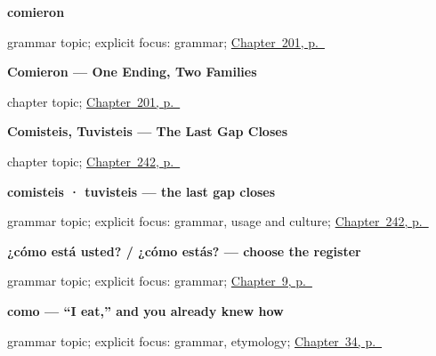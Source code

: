 \noindent\begin{minipage}[t]{\linewidth}
\raggedright
\textbf{comieron}\par
\footnotesize grammar topic; explicit focus: grammar; \hyperref[ch:comieron]{Chapter~201, p.~\pageref*{ch:comieron}}
\end{minipage}\par\smallskip

\noindent\begin{minipage}[t]{\linewidth}
\raggedright
\textbf{Comieron --- One Ending, Two Families}\par
\footnotesize chapter topic; \hyperref[ch:comieron]{Chapter~201, p.~\pageref*{ch:comieron}}
\end{minipage}\par\smallskip

\noindent\begin{minipage}[t]{\linewidth}
\raggedright
\textbf{Comisteis, Tuvisteis --- The Last Gap Closes}\par
\footnotesize chapter topic; \hyperref[ch:comisteis]{Chapter~242, p.~\pageref*{ch:comisteis}}
\end{minipage}\par\smallskip

\noindent\begin{minipage}[t]{\linewidth}
\raggedright
\textbf{comisteis · tuvisteis — the last gap closes}\par
\footnotesize grammar topic; explicit focus: grammar, usage and culture; \hyperref[ch:comisteis]{Chapter~242, p.~\pageref*{ch:comisteis}}
\end{minipage}\par\smallskip

\noindent\begin{minipage}[t]{\linewidth}
\raggedright
\textbf{¿cómo está usted? / ¿cómo estás? — choose the register}\par
\footnotesize grammar topic; explicit focus: grammar; \hyperref[ch:answering]{Chapter~9, p.~\pageref*{ch:answering}}
\end{minipage}\par\smallskip

\noindent\begin{minipage}[t]{\linewidth}
\raggedright
\textbf{como — \textquotedblleft{}I eat,\textquotedblright{} and you already knew how}\par
\footnotesize grammar topic; explicit focus: grammar, etymology; \hyperref[ch:spanish-comer]{Chapter~34, p.~\pageref*{ch:spanish-comer}}
\end{minipage}\par\smallskip

